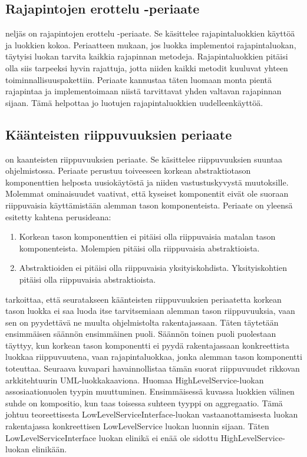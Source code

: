 \documentclass[a4paper,justified,notoc]{tufte-book}
\begin{document}
\begin{fullwidth}
\subsection{Rajapintojen erottelu -periaate}
\label{ISP}

 neljäs on \gls{rajapintojen erottelu -periaate}. Se käsittelee
rajapintaluokkien käyttöä ja luokkien kokoa. Periaatteen mukaan, jos luokka implementoi
rajapintaluokan, täytyisi luokan tarvita kaikkia rajapinnan metodeja. Rajapintaluokkien pitäisi
olla siis tarpeeksi hyvin rajattuja, jotta niiden kaikki metodit kuuluvat yhteen
toiminnallisuuspakettiin. Periaate kannustaa täten luomaan monta pientä rajapintaa ja
implementoimaan niistä tarvittavat yhden valtavan rajapinnan sijaan. Tämä helpottaa jo luotujen
rajapintaluokkien uudelleenkäyttöä.

\subsection{Käänteisten riippuvuuksien periaate}
\label{DIP}

 on \gls{kaanteisten riippuvuuksien periaate}. Se
käsittelee riippuvuuksien suuntaa ohjelmistossa. Periaate perustuu toiveeseen korkean
abstraktiotason komponenttien helposta uusiokäytöstä ja niiden vastustuskyvystä muutoksille.
Molemmat ominaisuudet vaativat, että kyseiset komponentit eivät ole suoraan riippuvaisia
käyttämistään alemman tason komponenteista. Periaate on yleensä esitetty kahtena perusideana:

\begin{enumerate}
	\item Korkean tason komponenttien ei pitäisi olla riippuvaisia matalan tason komponenteista. Molempien pitäisi olla riippuvaisia abstraktioista.
	\item Abstraktioiden ei pitäisi olla riippuvaisia yksityiskohdista. Yksityiskohtien pitäisi olla riippuvaisia abstraktioista.
\end{enumerate}

 tarkoittaa, että seuratakseen käänteisten riippuvuuksien periaatetta
korkean tason luokka ei saa luoda itse tarvitsemiaan alemman tason riippuvuuksia, vaan sen on
pyydettävä ne muulta ohjelmistolta rakentajassaan. Täten täytetään ensimmäisen säännön ensimmäinen
puoli. Säännön toinen puoli puolestaan täyttyy, kun korkean tason komponentti ei pyydä
rakentajassaan konkreettista luokkaa riippuvuutena, vaan rajapintaluokkaa, jonka alemman tason
komponentti toteuttaa. Seuraava kuvapari havainnollistaa tämän suorat riippuvuudet rikkovan
arkkitehtuurin \gls{UML}-luokkakaaviona. Huomaa HighLevelService-luokan assosiaationuolen tyypin
muuttuminen. Ensimmäisessä kuvassa luokkien välinen suhde on \gls{kompositio}, kun taas toisessa
suhteen tyyppi on \gls{aggregaatio}. Tämä johtuu teoreettisesta LowLevelServiceInterface-luokan
vastaanottamisesta luokan rakentajassa konkreettisen LowLevelService luokan luonnin sijaan.
Täten LowLevelServiceInterface luokan elinikä ei enää ole sidottu HighLevelService-luokan
elinikään.


\end{fullwidth}
\end{document}
